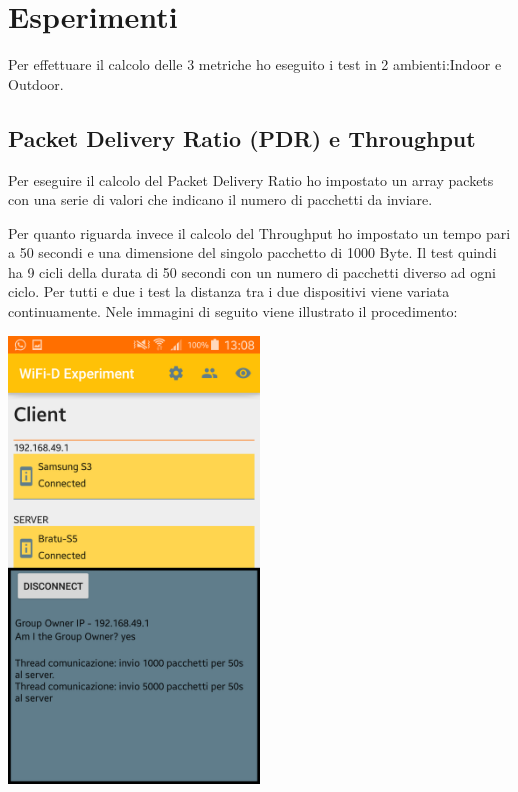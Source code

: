 \section{Esperimenti}
Per effettuare il calcolo delle 3 metriche ho eseguito i test in 2 ambienti:Indoor e Outdoor.

\subsection{Packet Delivery Ratio (PDR) e Throughput}

Per eseguire il calcolo del Packet Delivery Ratio ho impostato un array packets con una serie di valori che indicano il numero di pacchetti da inviare.

Per quanto riguarda invece il calcolo del Throughput ho impostato un tempo pari a 50 secondi e una dimensione del singolo pacchetto di 1000 Byte.
Il test quindi ha 9 cicli della durata di 50 secondi con un numero di pacchetti diverso ad ogni ciclo.
Per tutti e due i test la distanza tra i due dispositivi viene variata continuamente.
Nele immagini di seguito viene illustrato il procedimento:

\begin{center}
\includegraphics[width=0.5\textwidth]{imgs/Client.png}
\label{client_img}%
\end{center}

